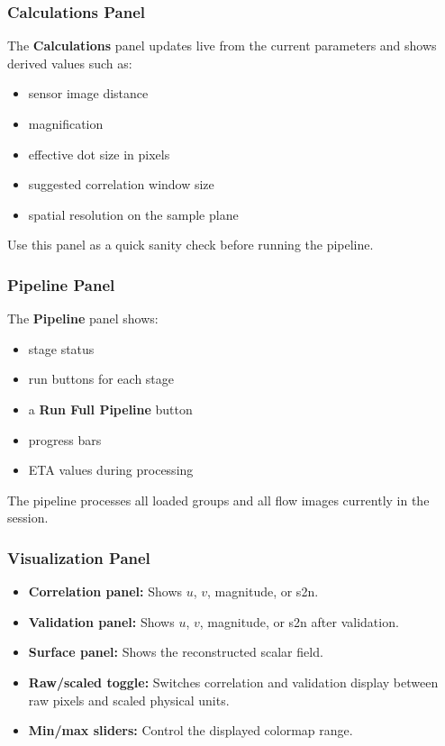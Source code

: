 \documentclass[11pt]{article}
\begin{document}
\subsubsection{Calculations Panel}

The \textbf{Calculations} panel updates live from the current parameters and shows derived values such as:
\begin{itemize}
    \item sensor image distance
    \item magnification
    \item effective dot size in pixels
    \item suggested correlation window size
    \item spatial resolution on the sample plane
\end{itemize}

Use this panel as a quick sanity check before running the pipeline.

\subsubsection{Pipeline Panel}

The \textbf{Pipeline} panel shows:
\begin{itemize}
    \item stage status
    \item run buttons for each stage
    \item a \textbf{Run Full Pipeline} button
    \item progress bars
    \item ETA values during processing
\end{itemize}

The pipeline processes all loaded groups and all flow images currently in the session.

\subsubsection{Visualization Panel}

\begin{itemize}
    \item \textbf{Correlation panel:} Shows $u$, $v$, magnitude, or s2n.
    \item \textbf{Validation panel:} Shows $u$, $v$, magnitude, or s2n after validation.
    \item \textbf{Surface panel:} Shows the reconstructed scalar field.
    \item \textbf{Raw/scaled toggle:} Switches correlation and validation display between raw pixels and scaled physical units.
    \item \textbf{Min/max sliders:} Control the displayed colormap range.
\end{itemize}
\end{document}
